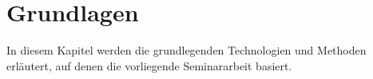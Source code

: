 \section{Grundlagen} \label{sec:grundlagen}

In diesem Kapitel werden die grundlegenden Technologien und Methoden erläutert, auf denen die vorliegende Seminararbeit basiert.


